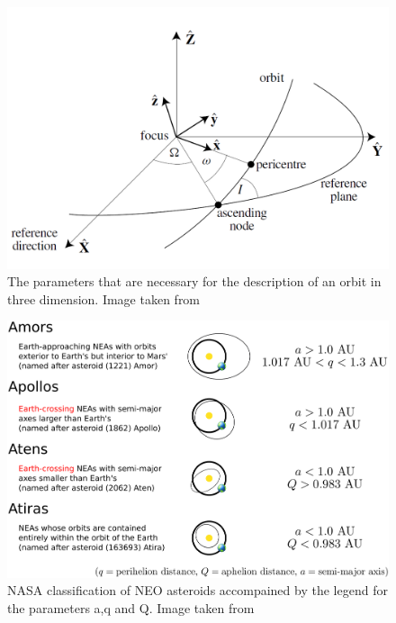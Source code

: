 \documentclass[12pt,%
               a4paper,%
               oneside,openany,%
               titlepage,%
               headinclude,footinclude,%
               BCOR5mm,%
               cleardoublepage=empty,%
               tablecaptionabove,%
               floatperchapter,
               ]{scrreprt}                 %
\begin{document}
\begin{figure}[h]
\begin{center}
\includegraphics[width=1\textwidth]{Figures/Inclination.png}
\caption{The parameters that are necessary for the description of an orbit in three dimension. Image taken from \cite{murray1999solar}}
\label{Inclination}
\end{center}
\end{figure}

\begin{figure}[h]
\begin{center}
\includegraphics[width=1\textwidth]{Figures/neo_orbit_types.jpg}
\caption{NASA classification of NEO asteroids accompained by the legend for the parameters a,q and Q. Image taken from \cite{nasa_classification}}
\label{neo_orbit_types}
\end{center}
\end{figure}






\newpage



\end{document}
